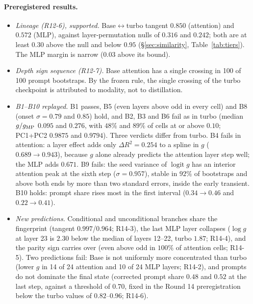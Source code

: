 \documentclass[11pt]{article}
\begin{document}
\paragraph{Preregistered results.}
\begin{itemize}
 \item \emph{Lineage (R12-6), supported.} Base$\leftrightarrow$turbo tangent $0.850$ (attention) and $0.572$ (MLP), against layer-permutation nulls of $0.316$ and $0.242$; both are at least $0.30$ above the null and below $0.95$ (\S\ref{sec:similarity}, Table~\ref{tab:tiers}). The MLP margin is narrow ($0.03$ above its bound).
 \item \emph{Depth sign sequence (R12-7).} Base attention has a single crossing in 100 of 100 prompt bootstraps. By the frozen rule, the single crossing of the turbo checkpoint is attributed to modality, not to distillation.
 \item \emph{B1--B10 replayed.} B1 passes, B5 (even layers above odd in every cell) and B8 (onset $\sigma=0.79$ and $0.85$) hold, and B2, B3 and B6 fail as in turbo (median $g/g_{\rm MP}$ $0.095$ and $0.276$, with $48\%$ and $89\%$ of cells at or above $0.10$; PC1+PC2 $0.9875$ and $0.9794$). Three verdicts differ from turbo. B4 fails in attention: a layer effect adds only $\Delta R^2=0.254$ to a spline in $g$ ($0.689\to0.943$), because $g$ alone already predicts the attention layer step well; the MLP adds $0.671$. B9 fails: the seed variance of $\operatorname{logit} g$ has an interior attention peak at the sixth step ($\sigma=0.957$), stable in $92\%$ of bootstraps and above both ends by more than two standard errors, inside the early transient. B10 holds: prompt share rises most in the first interval ($0.34\to0.46$ and $0.22\to0.41$).
 \item \emph{New predictions.} Conditional and unconditional branches share the fingerprint (tangent $0.997$/$0.964$; R14-3), the last MLP layer collapses ($\log g$ at layer 23 is $2.30$ below the median of layers 12--22, turbo $1.87$; R14-4), and the parity sign carries over (even above odd in $100\%$ of attention cells; R14-5). Two predictions fail: Base is not uniformly more concentrated than turbo (lower $g$ in 14 of 24 attention and 10 of 24 MLP layers; R14-2), and prompts do not dominate the final state (corrected prompt share $0.48$ and $0.52$ at the last step, against a threshold of $0.70$, fixed in the Round 14 preregistration below the turbo values of $0.82$--$0.96$; R14-6).
\end{itemize}
\end{document}
